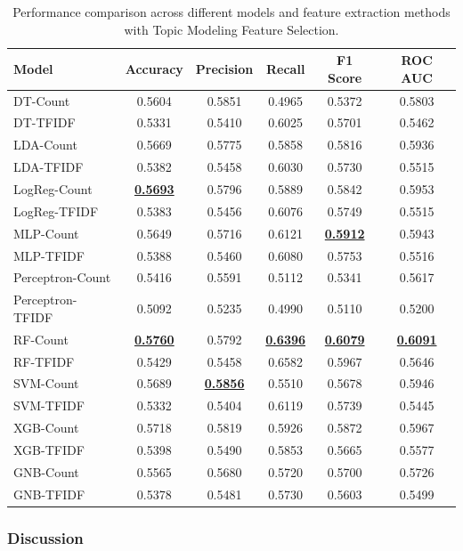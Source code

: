 \begin{table}[H]
\centering
\begin{tabular}{|l|c|c|c|c|c|}
\hline
\textbf{Model} & \textbf{Accuracy} & \textbf{Precision} & \textbf{Recall} & \textbf{F1 Score} & \textbf{ROC AUC} \\
\hline
DT-Count & 0.5604 & 0.5851 & 0.4965 & 0.5372 & 0.5803 \\
DT-TFIDF & 0.5331 & 0.5410 & 0.6025 & 0.5701 & 0.5462 \\
LDA-Count & 0.5669 & 0.5775 & 0.5858 & 0.5816 & 0.5936 \\
LDA-TFIDF & 0.5382 & 0.5458 & 0.6030 & 0.5730 & 0.5515 \\
LogReg-Count & \underline{\textbf{0.5693}} & 0.5796 & 0.5889 & 0.5842 & 0.5953 \\
LogReg-TFIDF & 0.5383 & 0.5456 & 0.6076 & 0.5749 & 0.5515 \\
MLP-Count & 0.5649 & 0.5716 & 0.6121 & \underline{\textbf{0.5912}} & 0.5943 \\
MLP-TFIDF & 0.5388 & 0.5460 & 0.6080 & 0.5753 & 0.5516 \\
Perceptron-Count & 0.5416 & 0.5591 & 0.5112 & 0.5341 & 0.5617 \\
Perceptron-TFIDF & 0.5092 & 0.5235 & 0.4990 & 0.5110 & 0.5200 \\
RF-Count & \underline{\textbf{0.5760}} & 0.5792 & \underline{\textbf{0.6396}} & \underline{\textbf{0.6079}} & \underline{\textbf{0.6091}} \\
RF-TFIDF & 0.5429 & 0.5458 & 0.6582 & 0.5967 & 0.5646 \\
SVM-Count & 0.5689 & \underline{\textbf{0.5856}} & 0.5510 & 0.5678 & 0.5946 \\
SVM-TFIDF & 0.5332 & 0.5404 & 0.6119 & 0.5739 & 0.5445 \\
XGB-Count & 0.5718 & 0.5819 & 0.5926 & 0.5872 & 0.5967 \\
XGB-TFIDF & 0.5398 & 0.5490 & 0.5853 & 0.5665 & 0.5577 \\
GNB-Count & 0.5565 & 0.5680 & 0.5720 & 0.5700 & 0.5726 \\
GNB-TFIDF & 0.5378 & 0.5481 & 0.5730 & 0.5603 & 0.5499 \\
\hline
\end{tabular}
\caption{Performance comparison across different models and feature extraction methods with Topic Modeling Feature Selection.}
\label{tab:topic_modeling_results}
\end{table}

\subsubsection{Discussion}

